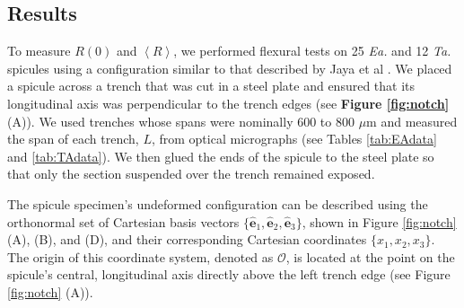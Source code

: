 \documentclass[12pt,onecolumn]{article}
\makeatletter
\newcommand{\ex}{{\bm{\hat{e}}}_1}
\newcommand{\ey}{{\bm{\hat{e}}}_2}
\newcommand{\ez}{{\bm{\hat{e}}}_3}
\newcommand{\TA}{\textit{Ta.\@}\xspace}
\newcommand{\EA}{\textit{Ea.\@}\xspace}
\makeatother
\begin{document}
\begin{bibunit}
\section{Results}
\label{sec:res}
To measure $R(0)$ and $\left< R \right>$, we performed flexural tests on 25 \EA and 12 \TA spicules using a configuration similar to that described  by Jaya et al \cite{jaya2012new,jaya2014crack,jaya2015can}. We placed a spicule across a trench that was cut in a steel plate and ensured that its longitudinal axis was perpendicular to the trench edges (see {\bf Figure \ref{fig:notch}} (A)). We used trenches whose spans were nominally 600 to 800 $\mu$m and measured the span of each trench, $L$, from optical micrographs (see Tables \ref{tab:EAdata} and \ref{tab:TAdata}). We then glued the ends of the spicule to the steel plate so that only the section suspended over the trench remained exposed. 

The spicule specimen's undeformed configuration can be described using the orthonormal set of Cartesian basis vectors $\{\ex,\ey,\ez\}$, shown in Figure \ref{fig:notch} (A), (B), and (D), and their corresponding Cartesian coordinates $\{x_1,x_2,x_3\}$. The origin of this coordinate system, denoted as $\mathcal{O}$, is located at the point on the spicule's central, longitudinal axis directly above the left trench edge (see Figure \ref{fig:notch} (A)).


\end{bibunit}
\end{document}
